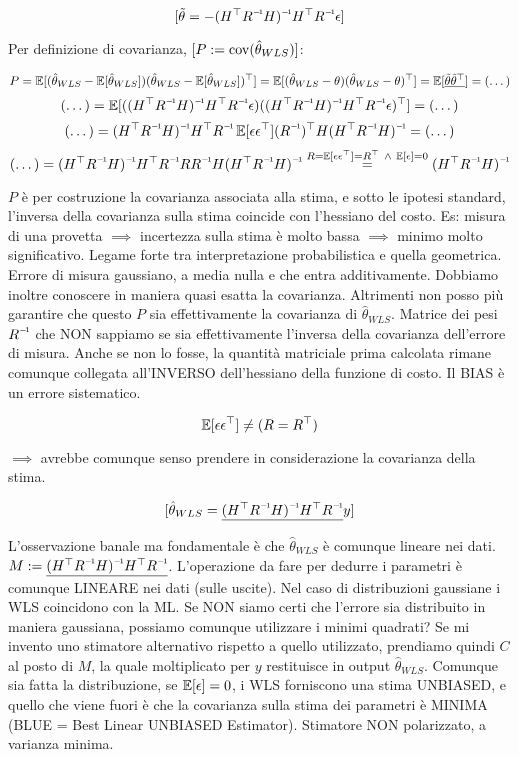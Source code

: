 \[
	[\tilde{\theta} = -\inv{(H^\top\inv{R}H)}H^\top\inv{R}\epsilon]
\]

Per definizione di covarianza, $[P := \operatorname{cov}(\hat{\theta}_{WLS})]$:

\[	
	P = \operatorname{\mathbb{E}}[(\hat{\theta}_{WLS}-\operatorname{\mathbb{E}}[\hat{\theta}_{WLS}])(\hat{\theta}_{WLS}-\operatorname{\mathbb{E}}[\hat{\theta}_{WLS}])^\top] = \operatorname{\mathbb{E}}[(\hat{\theta}_{WLS}-\theta)(\hat{\theta}_{WLS}-\theta)^\top] = \operatorname{\mathbb{E}}[\underline{\tilde{\theta}\tilde{\theta}^\top}] = (\dots)
\]
\[
	(\dots) = \E[(\inv{(H^\top\inv{R}H)}H^\top\inv{R}\epsilon)(\inv{(H^\top\inv{R}H)}H^\top\inv{R}\epsilon)^\top] = (\dots)
\]
\[
	(\dots) = \inv{(H^\top\inv{R}H)}H^\top\inv{R}\E[\epsilon\epsilon^\top](\inv{R})^\top H\inv{(H^\top\inv{R}H)} = (\dots)
\]
\[
	(\dots) = \inv{(H^\top\inv{R}H)}H^\top\inv{R}R\inv{R}H\inv{(H^\top\inv{R}H)} \stackrel{R=\E[\epsilon\epsilon^\top]=R^\top\ \land\ \E[\epsilon]=0}{=} \inv{(H^\top\inv{R}H)}
\]

$P$ è per costruzione la covarianza associata alla stima, e sotto le ipotesi standard, l'inversa della covarianza sulla stima coincide con l'hessiano del costo. Es: misura di una provetta $\implies$ incertezza sulla stima è molto bassa $\implies$ minimo molto significativo. Legame forte tra interpretazione probabilistica e quella geometrica. Errore di misura gaussiano, a media nulla e che entra additivamente. Dobbiamo inoltre conoscere in maniera quasi esatta la covarianza. Altrimenti non posso più garantire che questo $P$ sia effettivamente la covarianza di $\hat{\theta}_{WLS}$. Matrice dei pesi $\inv{R}$ che NON sappiamo se sia effettivamente l'inversa della covarianza dell'errore di misura. Anche se non lo fosse, la quantità matriciale prima calcolata rimane comunque collegata all'INVERSO dell'hessiano della funzione di costo. Il BIAS è un errore sistematico.

\[
	\operatorname{\mathbb{E}}[\epsilon\epsilon^\top] \neq (R=R^\top)
\]

$\implies$ avrebbe comunque senso prendere in considerazione la covarianza della stima.

\[
	[\hat{\theta}_{WLS} = \underline{\inv{(H^\top\inv{R}H)}H^\top\inv{R}}y]
\]

L'osservazione banale ma fondamentale è che $\hat{\theta}_{WLS}$ è comunque lineare nei dati. $M := \underline{\inv{(H^\top\inv{R}H)}H^\top\inv{R}}$. L'operazione da fare per dedurre i parametri è comunque LINEARE nei dati (sulle uscite). Nel caso di distribuzioni gaussiane i WLS coincidono con la ML. Se NON siamo certi che l'errore sia distribuito in maniera gaussiana, possiamo comunque utilizzare i minimi quadrati? Se mi invento uno stimatore alternativo rispetto a quello utilizzato, prendiamo quindi $C$ al posto di $M$, la quale moltiplicato per $y$ restituisce in output $\hat{\theta}_{WLS}$. Comunque sia fatta la distribuzione, se $\operatorname{\mathbb{E}}[\epsilon]=0$, i WLS forniscono una stima UNBIASED, e quello che viene fuori è che la covarianza sulla stima dei parametri è MINIMA (BLUE = Best Linear UNBIASED Estimator). Stimatore NON polarizzato, a varianza minima.

